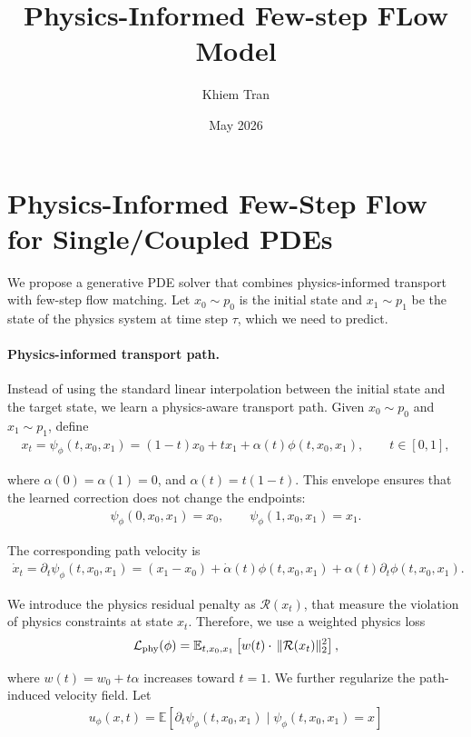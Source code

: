 \documentclass{article}
\title{Physics-Informed Few-step FLow Model}
\author{Khiem Tran}
\date{May 2026}
\begin{document}
\maketitle

\section{Physics-Informed Few-Step Flow for Single/Coupled PDEs}

We propose a generative PDE solver that combines physics-informed transport with few-step flow matching. Let $x_0 \sim p_0$ is the initial state and $x_1 \sim p_1$ be the state of the physics system at time step $\tau$, which we need to predict.

\paragraph{Physics-informed transport path.}
Instead of using the standard linear interpolation between the initial state and the target state, we
learn a physics-aware transport path. Given \(x_0\sim p_0\) and \(x_1\sim p_{1}\), define
\begin{align}
    x_t
    =
    \psi_\phi(t,x_0,x_1)
    =
    (1-t)x_0 + t x_1
    + \alpha(t)\phi(t,x_0,x_1),
    \qquad t\in[0,1],
\end{align}
    
where \(\alpha(0)=\alpha(1)=0\), and \(\alpha(t)=t(1-t)\). This envelope ensures
that the learned correction does not change the endpoints:
\begin{align}
    \psi_\phi(0,x_0,x_1)=x_0,
    \qquad
    \psi_\phi(1,x_0,x_1)=x_1.
\end{align}

The corresponding path velocity is
\begin{align}
    \dot x_t
    =
    \partial_t \psi_\phi(t,x_0,x_1) = (x_1 - x_0) + \dot{\alpha}(t)\phi(t,x_0,x_1) + \alpha(t)\partial_{t} \phi(t, x_0, x_1) .
\end{align}

We introduce the physics residual penalty as $\mathcal{R}(x_t)$, that measure the violation of physics constraints at state $x_t$. Therefore, we use a weighted physics loss
\begin{align}
    \mathcal L_{\rm phy}(\phi)
    =
    \mathbb E_{t,x_0,x_1}
    \left[
        w(t)\cdot\,
        \|\mathcal R(x_t)\|_2^2
    \right],
\end{align}

where \(w(t)= w_0 + t \alpha\) increases toward \(t=1\). 
We further regularize the path-induced velocity field. Let
\begin{align}
     u_\phi(x,t)
    =
    \mathbb E\left[
        \partial_t\psi_\phi(t,x_0,x_1)
        \mid
        \psi_\phi(t,x_0,x_1)=x
    \right]
\end{align}
\end{document}

